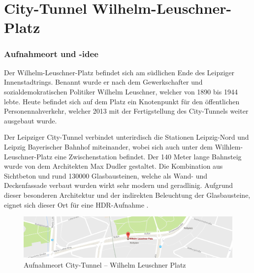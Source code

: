 \documentclass[liststotoc,bibtotoc,fontsize=14pt,]{scrreprt}
\begin{document}
	\section{City-Tunnel Wilhelm-Leuschner-Platz }
	\label{sec:tunnel}
	\subsubsection{Aufnahmeort und -idee}
	Der Wilhelm-Leuschner-Platz befindet sich am südlichen Ende des Leipziger Innenstadtrings. Benannt wurde er nach dem Gewerkschafter und sozialdemokratischen Politiker Wilhelm Leuschner, welcher von 1890 bis 1944 lebte. Heute befindet sich auf dem Platz ein Knotenpunkt für den öffentlichen Personennahverkehr, welcher 2013 mit der Fertigstellung des City-Tunnels weiter ausgebaut wurde. 
	
	\bigskip
	Der Leipziger City-Tunnel verbindet unterirdisch die Stationen Leipzig-Nord und Leipzig Bayerischer Bahnhof miteinander, wobei sich auch unter dem Wilhlem-Leuschner-Platz eine Zwischenstation befindet. Der 140 Meter lange Bahnsteig wurde von dem Architekten Max Dudler  gestaltet. Die Kombination aus Sichtbeton und rund 130000 Glasbausteinen, welche als Wand- und Deckenfassade verbaut wurden wirkt sehr modern und geradlinig. Aufgrund dieser besonderen Architektur und der indirekten Beleuchtung der Glasbausteine, eignet sich dieser Ort für eine HDR-Aufnahme
	.
\begin{figure}[H]
	\includegraphics[width=\linewidth]{img/places/leuscher_map.jpg}
	\caption{Aufnahmeort City-Tunnel -- Wilhelm Leuschner Platz}
	\label{img:ak_map}
\end{figure}
\end{document}
